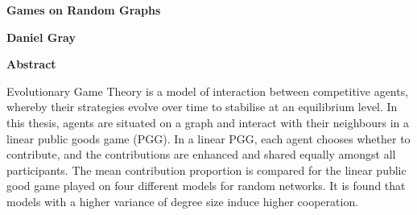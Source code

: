 \thispagestyle{plain}
\begin{center}
    \Large
    \textbf{Games on Random Graphs}
    
    \vspace{0.4cm}
    \large
    
    
    \vspace{0.4cm}
    \textbf{Daniel Gray}
    
    \vspace{0.9cm}
    \textbf{Abstract}
\end{center}
Evolutionary Game Theory is a model of interaction between competitive agents, whereby their strategies evolve over time to stabilise at an equilibrium level. In this thesis, agents are situated on a graph and interact with their neighbours in a linear public goods game (PGG). In a linear PGG,  each agent  chooses whether to contribute, and the contributions are enhanced and shared equally amongst all participants. The mean contribution proportion is compared for the linear public good game played on four different models for random networks. It is found that models with a higher variance of degree size induce higher cooperation.
